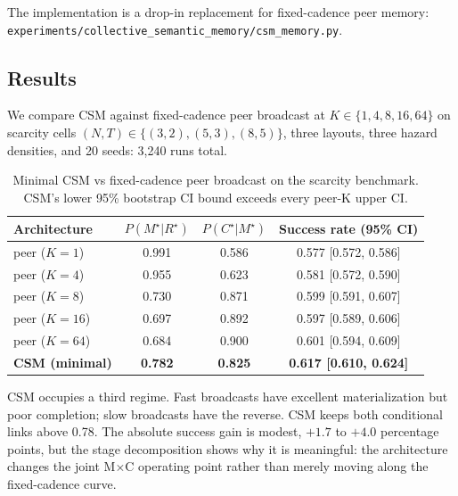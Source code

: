 \documentclass{article}
\newcommand{\method}[1]{\texttt{#1}}
\begin{document}
The implementation is a drop-in replacement for fixed-cadence peer
memory: \method{experiments/collective\_semantic\_memory/csm\_memory.py}.

\subsection{Results}

We compare CSM against fixed-cadence peer broadcast at
$K \in \{1,4,8,16,64\}$ on scarcity cells
$(N,T){\in}\{(3,2),(5,3),(8,5)\}$, three layouts, three hazard
densities, and 20 seeds: 3{,}240 runs total.

\begin{table}[ht]
\caption{Minimal CSM vs fixed-cadence peer broadcast on the scarcity benchmark. CSM's lower 95\% bootstrap CI bound exceeds every peer-K upper CI.}
\label{p4:tab:csm-results}
\centering
\small
\begin{tabular}{l c c c}
\toprule
Architecture & $P(M^\star|R^\star)$ & $P(C^\star|M^\star)$ & Success rate (95\% CI) \\
\midrule
peer ($K{=}1$)  & 0.991 & 0.586 & 0.577 [0.572, 0.586] \\
peer ($K{=}4$)  & 0.955 & 0.623 & 0.581 [0.572, 0.590] \\
peer ($K{=}8$)  & 0.730 & 0.871 & 0.599 [0.591, 0.607] \\
peer ($K{=}16$) & 0.697 & 0.892 & 0.597 [0.589, 0.606] \\
peer ($K{=}64$) & 0.684 & 0.900 & 0.601 [0.594, 0.609] \\
\textbf{CSM (minimal)} & \textbf{0.782} & \textbf{0.825} & \textbf{0.617 [0.610, 0.624]} \\
\bottomrule
\end{tabular}
\end{table}

CSM occupies a third regime. Fast broadcasts have excellent
materialization but poor completion; slow broadcasts have the reverse.
CSM keeps both conditional links above 0.78. The absolute success gain
is modest, $+1.7$ to $+4.0$ percentage points, but the stage
decomposition shows why it is meaningful: the architecture changes the
joint M$\times$C operating point rather than merely moving along the
fixed-cadence curve.
\end{document}
